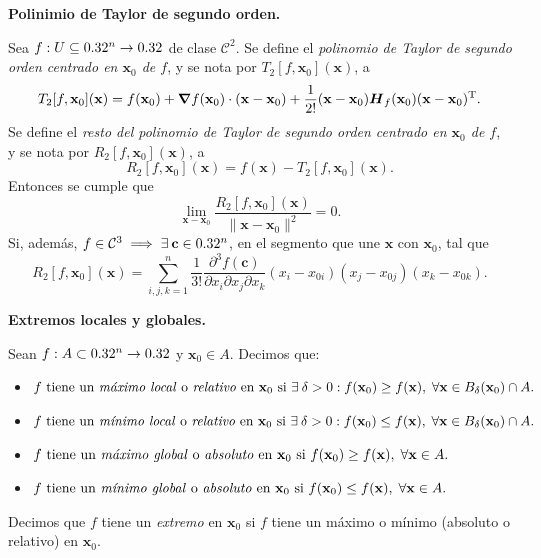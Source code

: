 \begin{theorem} \textbf{Polinimio de Taylor de segundo orden.}

  Sea $f:U\subseteq0.32^n\to0.32$ de clase $\mathcal{C}^2$. Se define el \emph{polinomio de Taylor de segundo orden centrado en $\mathbf{x}_0$ de $f$}, y se nota por $T_2[f,\mathbf{x}_0](\mathbf{x})$, a
  \[
    T_2[f,\mathbf{x}_0](\mathbf{x})=f(\mathbf{x}_0)+\grad{f}(\mathbf{x}_0)\cdot(\mathbf{x-x}_0)+\frac{1}{2!}(\mathbf{x-x}_0)\boldsymbol{H}_f(\mathbf{x}_0)(\mathbf{x-x}_0)^\text{T}.
  \]
  Se define el \emph{resto del polinomio de Taylor de segundo orden centrado en $\mathbf{x}_0$ de $f$}, y se nota por $R_2[f,\mathbf{x}_0](\mathbf{x})$, a
  \[
    R_2[f,\mathbf{x}_0](\mathbf{x})=f(\mathbf{x})-T_2[f,\mathbf{x}_0](\mathbf{x}).
  \]
  Entonces se cumple que
  \[
    \lim_{\mathbf{x-x}_0}\dfrac{R_2[f,\mathbf{x}_0](\mathbf{x})}{\|\mathbf{x-x}_0\|^2}=0.
  \]
  Si, adem\'as, $f\in\mathcal{C}^3\implies\exists\:\mathbf{c}\in0.32^n$, en el segmento que une $\mathbf{x}$ con $\mathbf{x}_0$, tal que
  \[
    R_2[f,\mathbf{x}_0](\mathbf{x})=\sum_{i,j,k=1}^{n}\frac{1}{3!}\dfrac{\partial^3 f(\mathbf{c})}{\partial x_i \partial x_j \partial x_k}(x_i-x_{0i})(x_j-x_{0j})(x_k-x_{0k}).
  \]
\end{theorem}


\begin{definition} \textbf{Extremos locales y globales.} \label{def:extremos}
 \mbox{}
 
 Sean $f: A \subset 0.32^n \to 0.32$ y $\mathbf{x}_0 \in A$. Decimos que:
 \begin{itemize}
  \item $f \text{ tiene un \emph{m\'aximo local} o \emph{relativo} en } \mathbf{x}_0 \text{ si } \exists\: \delta > 0 : f(\mathbf{x}_0) \ge f(\mathbf{x}),\;\forall \mathbf{x} \in B_{\delta}(\mathbf{x}_0) \cap A.$ 
  \item $f \text{ tiene un \emph{m\'inimo local} o \emph{relativo} en } \mathbf{x}_0 \text{ si } \exists\: \delta > 0 : f(\mathbf{x}_0) \le f(\mathbf{x}),\;\forall \mathbf{x} \in B_{\delta}(\mathbf{x}_0) \cap A.$
  \item $f \text{ tiene un \emph{m\'aximo global} o \emph{absoluto} en } \mathbf{x}_0 \text{ si } f(\mathbf{x}_0) \ge f(\mathbf{x}),\;\forall \mathbf{x} \in A.$ 
  \item $f \text{ tiene un \emph{m\'inimo global} o \emph{absoluto} en } \mathbf{x}_0 \text{ si } f(\mathbf{x}_0) \le f(\mathbf{x}),\;\forall \mathbf{x} \in A.$
 \end{itemize}
 Decimos que $f$ tiene un \emph{extremo} en $\mathbf{x}_0$ si $f$ tiene un m\'aximo o m\'inimo (absoluto o relativo) en $\mathbf{x}_0$.
\end{definition}

